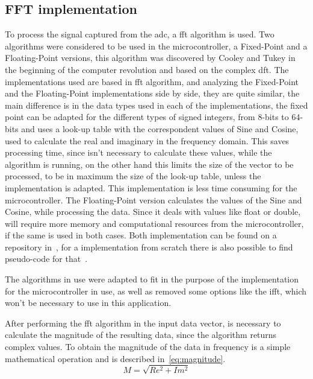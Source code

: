 \subsection{FFT implementation}\label{subsec:fftImp}
To process the signal captured from the \acrshort{adc}, a \acrshort{fft} algorithm is used. Two algorithms were considered to be used in the microcontroller, a Fixed-Point and a Floating-Point versions, this algorithm was discovered by Cooley and Tukey in the beginning of the computer revolution and based on the complex \acrshort{dft}. The implementations used are based in \acrshort{fft} algorithm, and analyzing the Fixed-Point and the Floating-Point implementations side by side, they are quite similar, the main difference is in the data types used in each of the implementations, the fixed point can be adapted for the different types of signed integers, from 8-bits to 64-bits and uses a look-up table with the correspondent values of Sine and Cosine, used to calculate the real and imaginary in the frequency domain. This saves processing time, since isn't necessary to calculate these values, while the algorithm is running, on the other hand this limits the size of the vector to be processed, to be in maximum the size of the look-up table, unless the implementation is adapted. This implementation is less time consuming for the microcontroller. The Floating-Point version calculates the values of the Sine and Cosine, while processing the data. Since it deals with values like float or double, will require more memory and computational resources from the microcontroller, if the same is used in both cases. Both implementation can be found on a repository in~\cite{262588213843476FixFft,Dannyf00FloatingPointFFTBenchmarka}, for a implementation from scratch there is also possible to find pseudo-code for that~\cite{smith1997scientist}.

The algorithms in use were adapted to fit in the purpose of the implementation for the microcontroller in use, as well as removed some options like the \acrshort{ifft}, which won't be necessary to use in this application.

After performing the \acrshort{fft} algorithm in the input data vector, is necessary to calculate the magnitude of the resulting data, since the algorithm returns complex values. To obtain the magnitude of the data in frequency is a simple mathematical operation and is described in~\ref{eq:magnitude}.
\begin{equation}\label{eq:magnitude}
    M = \sqrt{Re^2 + Im^2}
\end{equation}
